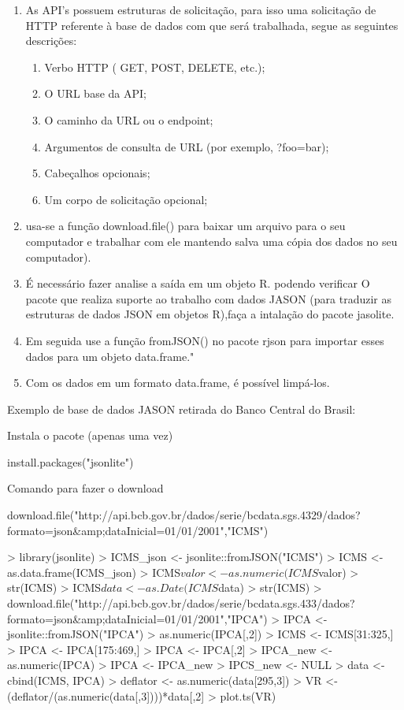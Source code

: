 \documentclass[12pt,a4paper,oneside]{erdc}
\begin{document}
\begin{enumerate}
	\item As API's possuem estruturas de solicitação, para isso uma solicitação de HTTP referente à base de dados com que será trabalhada, segue as seguintes descrições:
	\begin{enumerate}
		\item Verbo HTTP ( GET, POST, DELETE, etc.);
		\item O URL base da API;
		\item O caminho da URL ou o endpoint;
		\item Argumentos de consulta de URL (por exemplo, ?foo=bar);
		\item Cabeçalhos opcionais;
		\item Um corpo de solicitação opcional;
	\end{enumerate}
	
	\item usa-se a função download.file() para baixar um arquivo para o seu computador e trabalhar com ele mantendo salva uma cópia dos dados no seu computador).
	
	\item É necessário fazer analise a saída em um objeto R. podendo verificar O pacote que realiza suporte ao trabalho com dados JASON (para traduzir as estruturas de dados JSON em objetos R),faça a intalação do pacote jasolite.
	
	\item Em seguida use a função fromJSON() no pacote rjson para importar esses dados para um objeto data.frame."
	
	\item Com os dados em um formato data.frame, é possível limpá-los. 
	
	
\end{enumerate}

Exemplo de base de dados JASON retirada do Banco Central do Brasil:

Instala o pacote (apenas uma vez)

install.packages("jsonlite")

Comando para fazer o download

download.file("http://api.bcb.gov.br/dados/serie/bcdata.sgs.4329/dados?formato=json\&amp;dataInicial=01/01/2001","ICMS")

\begin{Schunk}
\begin{Sinput}
> library(jsonlite)
> ICMS_json <- jsonlite::fromJSON("ICMS")
> ICMS <- as.data.frame(ICMS_json)
> ICMS$valor <- as.numeric(ICMS$valor)
> str(ICMS)
> ICMS$data <- as.Date(ICMS$data)
> str(ICMS)
> download.file("http://api.bcb.gov.br/dados/serie/bcdata.sgs.433/dados?formato=json&amp;dataInicial=01/01/2001","IPCA")
> IPCA <- jsonlite::fromJSON("IPCA")
> as.numeric(IPCA[,2])
> ICMS <- ICMS[31:325,]
> IPCA <- IPCA[175:469,]
> IPCA <- IPCA[,2]
> IPCA_new <- as.numeric(IPCA)
> IPCA <- IPCA_new
> IPCS_new <- NULL
> data <- cbind(ICMS, IPCA)
> deflator <- as.numeric(data[295,3])
> VR <- (deflator/(as.numeric(data[,3])))*data[,2]
> plot.ts(VR)
\end{Sinput}
\end{Schunk}
\end{document}
